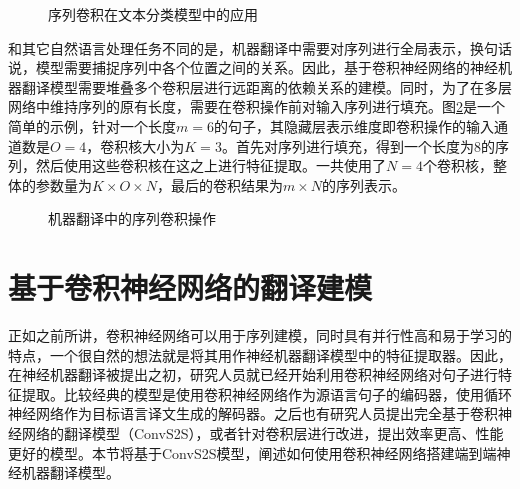 \begin{figure}[htp]
\centering

\caption{序列卷积在文本分类模型中的应用}
\label{fig:11-10}
\end{figure}
\vspace{-1em}
\parinterval 和其它自然语言处理任务不同的是，机器翻译中需要对序列进行全局表示，换句话说，模型需要捕捉序列中各个位置之间的关系。因此，基于卷积神经网络的神经机器翻译模型需要堆叠多个卷积层进行远距离的依赖关系的建模。同时，为了在多层网络中维持序列的原有长度，需要在卷积操作前对输入序列进行填充。图\ref{fig:11-11}是一个简单的示例，针对一个长度$m=6$的句子，其隐藏层表示维度即卷积操作的输入通道数是$O=4$，卷积核大小为$K=3$。首先对序列进行填充，得到一个长度为8的序列，然后使用这些卷积核在这之上进行特征提取。一共使用了$N=4$个卷积核，整体的参数量为$K \times O \times N$，最后的卷积结果为$m \times N$的序列表示。

\begin{figure}[htp]
\centering
%

\caption{机器翻译中的序列卷积操作}
\label{fig:11-11}
\end{figure}
\sectionnewpage
\section{基于卷积神经网络的翻译建模}

\parinterval 正如之前所讲，卷积神经网络可以用于序列建模，同时具有并行性高和易于学习的特点，一个很自然的想法就是将其用作神经机器翻译模型中的特征提取器。因此，在神经机器翻译被提出之初，研究人员就已经开始利用卷积神经网络对句子进行特征提取。比较经典的模型是使用卷积神经网络作为源语言句子的编码器，使用循环神经网络作为目标语言译文生成的解码器。之后也有研究人员提出完全基于卷积神经网络的翻译模型（ConvS2S），或者针对卷积层进行改进，提出效率更高、性能更好的模型。本节将基于ConvS2S模型，阐述如何使用卷积神经网络搭建端到端神经机器翻译模型。

